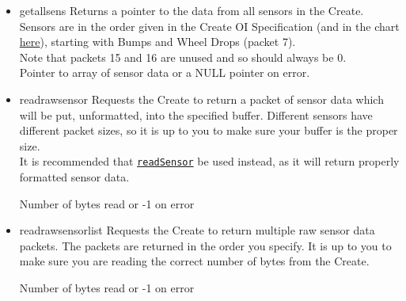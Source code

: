 \documentclass {article}
\begin{document}
\begin {itemize}
   \item {} {getallsens}
         Returns a pointer to the data from all sensors in the Create.  Sensors are in the order
         given in the Create OI Specification (and in the chart \hyperlink {oisensor}{here}),
         starting with Bumps and Wheel Drops (packet 7). \\
         Note that packets 15 and 16 are unused and so should always be 0. \\
         \ret Pointer to array of sensor data or a NULL pointer on error.

   \item {} {readrawsensor}
        Requests the Create to return a packet of sensor data which will be put, unformatted, into
        the specified buffer.  Different sensors have different packet sizes, so it is up to you to
        make sure your buffer is the proper size. \\
        It is recommended that \hyperlink {readsensor}{{\tt readSensor}} be used instead, as it will
        return properly formatted sensor data. \\
        \ret Number of bytes read or -1 on error
        
   \item {} {readrawsensorlist}
         Requests the Create to return multiple raw sensor data packets.  The packets are returned in
         the order you specify.  It is up to you to make sure you are reading the correct number of
         bytes from the Create. \\
         \ret Number of bytes read or -1 on error
\end {itemize}
\end{document}
